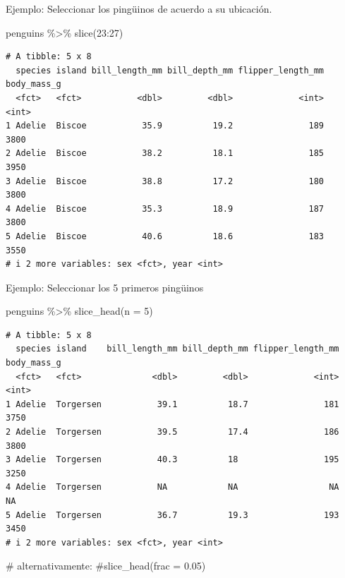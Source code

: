 \documentclass[
  letterpaper,
  DIV=11,
  numbers=noendperiod]{scrreprt}
\newenvironment{Shaded}{\begin{snugshade}}{\end{snugshade}}
\newcommand{\AttributeTok}[1]{\textcolor[rgb]{0.40,0.45,0.13}{#1}}
\newcommand{\CommentTok}[1]{\textcolor[rgb]{0.37,0.37,0.37}{#1}}
\newcommand{\DecValTok}[1]{\textcolor[rgb]{0.68,0.00,0.00}{#1}}
\newcommand{\FunctionTok}[1]{\textcolor[rgb]{0.28,0.35,0.67}{#1}}
\newcommand{\NormalTok}[1]{\textcolor[rgb]{0.00,0.23,0.31}{#1}}
\newcommand{\SpecialCharTok}[1]{\textcolor[rgb]{0.37,0.37,0.37}{#1}}
\begin{document}
{Ejemplo}: Seleccionar los pingüinos de acuerdo a su ubicación.

\begin{Shaded}
\begin{Highlighting}[]
\NormalTok{penguins }\SpecialCharTok{\%\textgreater{}\%} 
  \FunctionTok{slice}\NormalTok{(}\DecValTok{23}\SpecialCharTok{:}\DecValTok{27}\NormalTok{)}
\end{Highlighting}
\end{Shaded}

\begin{verbatim}
# A tibble: 5 x 8
  species island bill_length_mm bill_depth_mm flipper_length_mm body_mass_g
  <fct>   <fct>           <dbl>         <dbl>             <int>       <int>
1 Adelie  Biscoe           35.9          19.2               189        3800
2 Adelie  Biscoe           38.2          18.1               185        3950
3 Adelie  Biscoe           38.8          17.2               180        3800
4 Adelie  Biscoe           35.3          18.9               187        3800
5 Adelie  Biscoe           40.6          18.6               183        3550
# i 2 more variables: sex <fct>, year <int>
\end{verbatim}

{Ejemplo}: Seleccionar los 5 primeros pingüinos

\begin{Shaded}
\begin{Highlighting}[]
\NormalTok{penguins }\SpecialCharTok{\%\textgreater{}\%} 
  \FunctionTok{slice\_head}\NormalTok{(}\AttributeTok{n =} \DecValTok{5}\NormalTok{) }
\end{Highlighting}
\end{Shaded}

\begin{verbatim}
# A tibble: 5 x 8
  species island    bill_length_mm bill_depth_mm flipper_length_mm body_mass_g
  <fct>   <fct>              <dbl>         <dbl>             <int>       <int>
1 Adelie  Torgersen           39.1          18.7               181        3750
2 Adelie  Torgersen           39.5          17.4               186        3800
3 Adelie  Torgersen           40.3          18                 195        3250
4 Adelie  Torgersen           NA            NA                  NA          NA
5 Adelie  Torgersen           36.7          19.3               193        3450
# i 2 more variables: sex <fct>, year <int>
\end{verbatim}

\begin{Shaded}
\begin{Highlighting}[]
\CommentTok{\# alternativamente: }
\CommentTok{\#slice\_head(frac = 0.05)}
\end{Highlighting}
\end{Shaded}
\end{document}
